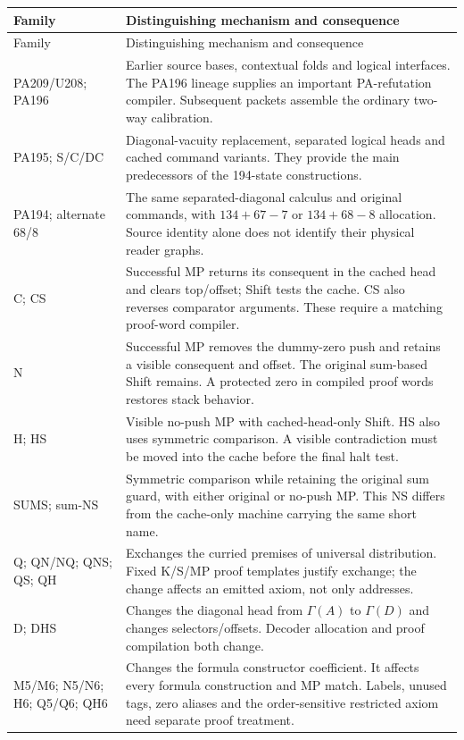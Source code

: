 \begingroup\small
\begin{longtable}{@{}p{}p{}@{}}
\toprule Family & Distinguishing mechanism and consequence\\\midrule\endfirsthead
\toprule Family & Distinguishing mechanism and consequence\\\midrule\endhead
PA209/U208; PA196 & Earlier source bases, contextual folds and logical interfaces. The PA196 lineage supplies an important PA-refutation compiler. Subsequent packets assemble the ordinary two-way calibration.\\[4pt]
PA195; S/C/DC & Diagonal-vacuity replacement, separated logical heads and cached command variants. They provide the main predecessors of the 194-state constructions.\\[4pt]
PA194; alternate 68/8 & The same separated-diagonal calculus and original commands, with $134+67-7$ or $134+68-8$ allocation. Source identity alone does not identify their physical reader graphs.\\[4pt]
C; CS & Successful MP returns its consequent in the cached head and clears top/offset; Shift tests the cache. CS also reverses comparator arguments. These require a matching proof-word compiler.\\[4pt]
N & Successful MP removes the dummy-zero push and retains a visible consequent and offset. The original sum-based Shift remains. A protected zero in compiled proof words restores stack behavior.\\[4pt]
H; HS & Visible no-push MP with cached-head-only Shift. HS also uses symmetric comparison. A visible contradiction must be moved into the cache before the final halt test.\\[4pt]
SUMS; sum-NS & Symmetric comparison while retaining the original sum guard, with either original or no-push MP. This NS differs from the cache-only machine carrying the same short name.\\[4pt]
Q; QN/NQ; QNS; QS; QH & Exchanges the curried premises of universal distribution. Fixed K/S/MP proof templates justify exchange; the change affects an emitted axiom, not only addresses.\\[4pt]
D; DHS & Changes the diagonal head from $\Gamma(A)$ to $\Gamma(D)$ and changes selectors/offsets. Decoder allocation and proof compilation both change.\\[4pt]
M5/M6; N5/N6; H6; Q5/Q6; QH6 & Changes the formula constructor coefficient. It affects every formula construction and MP match. Labels, unused tags, zero aliases and the order-sensitive restricted axiom need separate proof treatment.\\[4pt]

\end{longtable}
